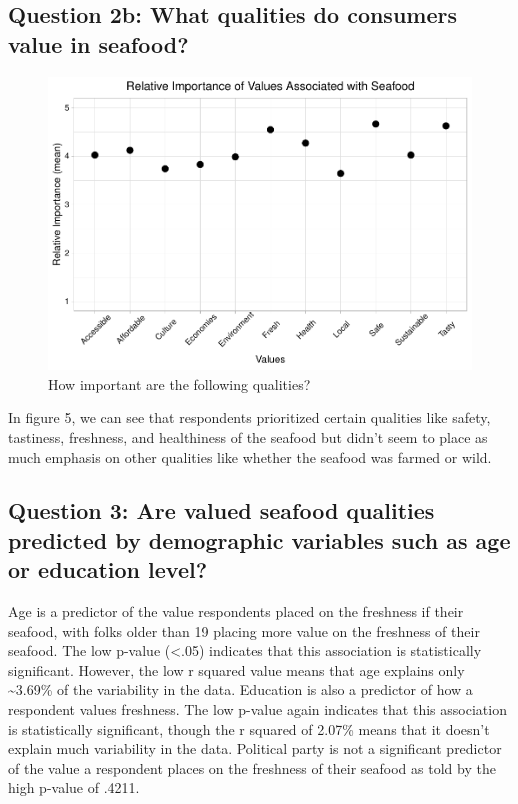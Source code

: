 \documentclass[
  12pt,
]{article}
\begin{document}
\hypertarget{question-2b-what-qualities-do-consumers-value-in-seafood}{%
\subsection{Question 2b: What qualities do consumers value in
seafood?}\label{question-2b-what-qualities-do-consumers-value-in-seafood}}

\begin{figure}
\centering
\includegraphics{Final_rmd_files/figure-latex/importance-1.pdf}
\caption{How important are the following qualities?}
\end{figure}

In figure 5, we can see that respondents prioritized certain qualities
like safety, tastiness, freshness, and healthiness of the seafood but
didn't seem to place as much emphasis on other qualities like whether
the seafood was farmed or wild.

\newpage

\hypertarget{question-3-are-valued-seafood-qualities-predicted-by-demographic-variables-such-as-age-or-education-level}{%
\subsection{Question 3: Are valued seafood qualities predicted by
demographic variables such as age or education
level?}\label{question-3-are-valued-seafood-qualities-predicted-by-demographic-variables-such-as-age-or-education-level}}

Age is a predictor of the value respondents placed on the freshness if
their seafood, with folks older than 19 placing more value on the
freshness of their seafood. The low p-value (\textless.05) indicates
that this association is statistically significant. However, the low r
squared value means that age explains only \textasciitilde3.69\% of the
variability in the data. Education is also a predictor of how a
respondent values freshness. The low p-value again indicates that this
association is statistically significant, though the r squared of 2.07\%
means that it doesn't explain much variability in the data. Political
party is not a significant predictor of the value a respondent places on
the freshness of their seafood as told by the high p-value of .4211.
\end{document}
